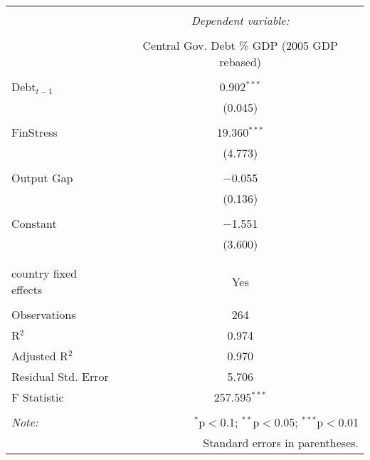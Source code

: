 
\begin{tabular}{@{\extracolsep{5pt}}lc} 
\\[-1.8ex]\hline 
\hline \\[-1.8ex] 
 & \multicolumn{1}{c}{\textit{Dependent variable:}} \\ 
\cline{2-2} 
\\[-1.8ex] & Central Gov. Debt \% GDP (2005 GDP rebased) \\ 
\hline \\[-1.8ex] 
 Debt$_{t-1}$ & 0.902$^{***}$ \\ 
  & (0.045) \\ 
  & \\ 
 FinStress & 19.360$^{***}$ \\ 
  & (4.773) \\ 
  & \\ 
 Output Gap & $-$0.055 \\ 
  & (0.136) \\ 
  & \\ 
 Constant & $-$1.551 \\ 
  & (3.600) \\ 
  & \\ 
\hline \\[-1.8ex] 
country fixed effects & Yes \\ 
\hline \\[-1.8ex] 
Observations & 264 \\ 
R$^{2}$ & 0.974 \\ 
Adjusted R$^{2}$ & 0.970 \\ 
Residual Std. Error & 5.706 \\ 
F Statistic & 257.595$^{***}$ \\ 
\hline 
\hline \\[-1.8ex] 
\textit{Note:}  & \multicolumn{1}{r}{$^{*}$p$<$0.1; $^{**}$p$<$0.05; $^{***}$p$<$0.01} \\ 
 & \multicolumn{1}{r}{Standard errors in parentheses.} \\ 
\end{tabular} 

